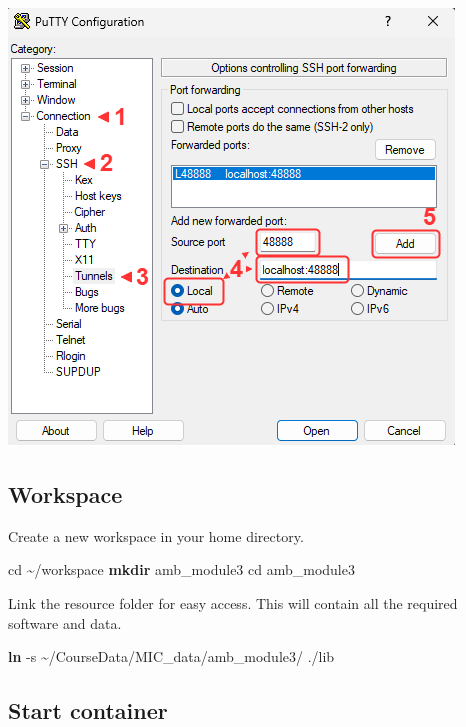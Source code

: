 \documentclass[
]{book}
\newenvironment{Shaded}{\begin{snugshade}}{\end{snugshade}}
\newcommand{\AttributeTok}[1]{\textcolor[rgb]{0.13,0.29,0.53}{#1}}
\newcommand{\BuiltInTok}[1]{#1}
\newcommand{\FunctionTok}[1]{\textcolor[rgb]{0.13,0.29,0.53}{\textbf{#1}}}
\newcommand{\NormalTok}[1]{#1}
\begin{document}
\includegraphics{img/lab3/putty_port_forward.png}

\subsection{Workspace}\label{workspace}

Create a new workspace in your home directory.

\begin{Shaded}
\begin{Highlighting}[]
\BuiltInTok{cd}\NormalTok{ \textasciitilde{}/workspace}
\FunctionTok{mkdir}\NormalTok{ amb\_module3}
\BuiltInTok{cd}\NormalTok{ amb\_module3}
\end{Highlighting}
\end{Shaded}

Link the resource folder for easy access. This will contain all the required software and data.

\begin{Shaded}
\begin{Highlighting}[]
\FunctionTok{ln} \AttributeTok{{-}s}\NormalTok{ \textasciitilde{}/CourseData/MIC\_data/amb\_module3/ ./lib}
\end{Highlighting}
\end{Shaded}

\subsection{Start container}\label{start-container}
\end{document}
